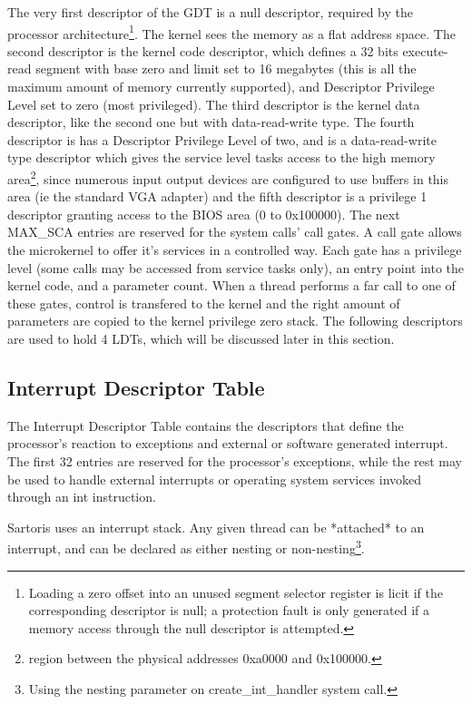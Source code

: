 \documentclass[11pt, letterpaper, twoside, english]{book}
\begin{document}
The very first descriptor of the GDT is a null descriptor, required by the processor architecture\footnote{Loading a zero offset into an unused segment selector register is licit if the corresponding descriptor is null; a protection fault is only generated if a memory access through the null descriptor is attempted.}. The kernel sees the memory as a flat address space. The second descriptor is the kernel code descriptor, which defines a 32 bits execute-read segment with base zero and limit set to 16 megabytes (this is all the maximum amount of memory currently supported), and Descriptor Privilege Level set to zero (most privileged). The third descriptor is the kernel data descriptor, like the second one but with data-read-write type. The fourth descriptor is has a Descriptor Privilege Level of two, and is a data-read-write type descriptor which gives the service level tasks access to the high memory area\footnote{region between the physical addresses 0xa0000 and 0x100000.}, since numerous input output devices are configured to use buffers in this area (ie the standard VGA adapter) and the fifth descriptor is a privilege 1 descriptor granting access to the BIOS area (0 to 0x100000). The next \textsf{MAX\_SCA} entries are reserved for the system calls' call gates. A call gate allows the microkernel to offer it's services in a controlled way. Each gate has a privilege level (some calls may be accessed from service tasks only), an entry point into the kernel code, and a parameter count. When a thread performs a far call to one of these gates, control is transfered to the kernel and the right amount of parameters are copied to the kernel privilege zero stack. The following descriptors are used to hold 4 LDTs, which will be discussed later in this section.

\subsection{Interrupt Descriptor Table}

The Interrupt Descriptor Table contains the descriptors that define the processor's reaction to exceptions and external or software generated interrupt. The first 32 entries are reserved for the processor's exceptions, while the rest may be used to handle external interrupts or operating system services invoked through an \textsf{int} instruction. 

Sartoris uses an interrupt stack. Any given thread can be *attached* to an interrupt, and can be declared as either nesting or non-nesting\footnote{Using the \textsf{nesting} parameter on \textsf{create\_int\_handler} system call.}. 
\end{document}
